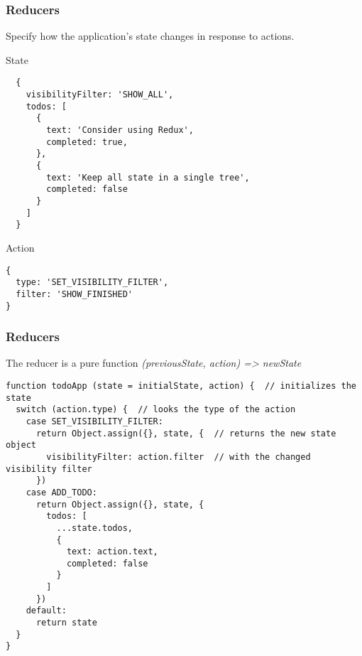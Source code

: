 \begin{frame}[fragile]
  \frametitle{Reducers}
  Specify how the application's state changes in response to actions.

  \begin{multicols}{2}
  \footnotesize State
	\begin{verbatim}
  {
    visibilityFilter: 'SHOW_ALL',
    todos: [
      {
        text: 'Consider using Redux',
        completed: true,
      },
      {
        text: 'Keep all state in a single tree',
        completed: false
      }
    ]
  }
  \end{verbatim}

  \columnbreak

  \footnotesize Action
	\begin{verbatim}
{
  type: 'SET_VISIBILITY_FILTER',
  filter: 'SHOW_FINISHED'
}
  \end{verbatim}

  \end{multicols}
\end{frame}

\begin{frame}[fragile]
  \frametitle{Reducers}

  \small The reducer is a pure function \textit{(previousState, action) => newState}

  \begin{verbatim}
function todoApp (state = initialState, action) {  // initializes the state
  switch (action.type) {  // looks the type of the action
    case SET_VISIBILITY_FILTER:
      return Object.assign({}, state, {  // returns the new state object
        visibilityFilter: action.filter  // with the changed visibility filter
      })
    case ADD_TODO:
      return Object.assign({}, state, {
        todos: [
          ...state.todos,
          {
            text: action.text,
            completed: false
          }
        ]
      })    
    default:
      return state
  }
}
  \end{verbatim}
\end{frame}

